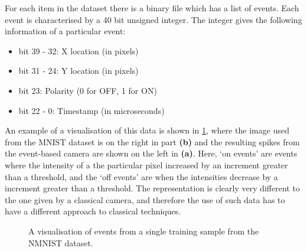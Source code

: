For each item in the dataset there is a binary file which has a list of events. Each event is characterised by a 40 bit unsigned integer. The integer gives the following information of a particular event:

\begin{itemize}
      \item bit 39 - 32: X location (in pixels)
      \item bit 31 - 24: Y location (in pixels)
      \item bit 23: Polarity (0 for OFF, 1 for ON)
      \item bit 22 - 0: Timestamp (in microseconds)
\end{itemize}

An example of a visualisation of this data is shown in \cref{fig:nmnist_spikes_visualisation}, where the image used from the MNIST dataset is on the right in part \textbf{(b)} and the resulting spikes from the event-based camera are shown on the left in \textbf{(a)}. Here, `on events' are events where the intensity of a the particular pixel increased by an increment greater than a threshold, and the `off events' are when the intensities decrease by a increment greater than a threshold. The representation is clearly very different to the one given by a classical camera, and therefore the use of such data has to have a different approach to classical techniques.

\begin{figure}[htb]%
      \centering
      \qquad
      \caption{A visualisation of events from a single training sample from the NMNIST dataset.}%
      \label{fig:nmnist_spikes_visualisation}%
\end{figure}

